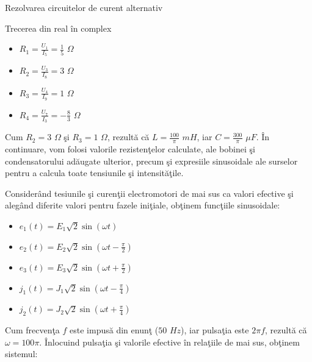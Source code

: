 \documentclass[a4paper]{article}
\begin{document}
\begin{section}{Rezolvarea circuitelor de curent alternativ}
\begin{subsection}{Trecerea din real \^ in complex\\}
\begin{multicols}{2}
\begin{large}
	\begin{itemize}
		\item $ R_1 = \frac{U_1}{I_5} =  \frac{1}{5}$ $ \Omega $
		\item $ R_2 = \frac{U_3}{I_8} = 3$ $ \Omega $
		\item $ R_3 = \frac{U_4}{I_9} = 1$ $ \Omega $
		\item $ R_4 = \frac{U_7}{I_3} = - \frac{8}{3} $ $ \Omega $ 
	\end{itemize} \par
\end{large}
\end{multicols}

	 Cum $ R_2 = 3 $ $ \Omega $ \c si $ R_3 = 1 $ $ \Omega $, rezult\u a c\u a $ L = \frac{100}{\pi} $ $ mH $, iar $ C = \frac{300}{\pi} $ $ \mu F $.
	\^ In continuare, vom folosi valorile rezisten\c telor calculate, ale bobinei \c si condensatorului ad\u augate ulterior, precum \c si expresiile sinusoidale ale surselor pentru a calcula toate tensiunile \c si intensit\u a\c tile. \\  \par

	Consider\^ and tesiunile \c si curen\c tii electromotori de mai sus ca valori efective \c si aleg\^ and diferite valori pentru fazele ini\c tiale, ob\c tinem func\c tiile sinusoidale:

\begin{multicols}{2}
\begin{large}
	\begin{itemize}
		\item $ e_1(t) = E_1 \sqrt2 \sin{(\omega t)} $
		\item $ e_2(t) = E_2 \sqrt2 \sin{(\omega t - \frac{\pi}{2})} $
		\item $ e_3(t) = E_3 \sqrt2 \sin{(\omega t + \frac{\pi}{2})} $
		
		\item $ j_1(t) = J_1 \sqrt2 \sin{(\omega t - \frac{\pi}{4})} $
		\item $ j_2(t) = J_2 \sqrt2 \sin{(\omega t + \frac{\pi}{4})} $ \\
	\end{itemize} \par
\end{large}
\end{multicols}

	Cum frecven\c ta $ f $ este impus\u a din enun\c t ($ 50 $ $ Hz $), iar pulsa\c tia  este $ 2\pi f$, rezult\u a c\u a $ \omega = 100\pi $. \^ Inlocuind pulsa\c tia \c si valorile efective \^ in rela\c tiile de mai sus, ob\c tinem sistemul: 


\end{subsection}
\end{section}
\end{document}

